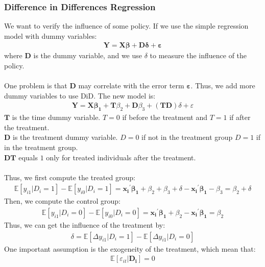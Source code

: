 \documentclass{article}
\begin{document}
\subsubsection{Difference in Differences Regression}
We want to verify the influence of some policy. If we use the simple regression model with dummy variables:
	\begin{align*}
		\boldsymbol{Y} = \boldsymbol{X} \boldsymbol{\beta} + \boldsymbol{D} \boldsymbol{\delta} + \boldsymbol{\varepsilon}
	\end{align*}
where $\boldsymbol{D}$ is the dummy variable, and we use $\delta$ to measure the influence of the policy.\\\\
One problem is that $\boldsymbol{D}$ may correlate with the error term $\boldsymbol{\varepsilon}$. Thus, we add more dummy variables to use DiD. The new model is:
	\begin{align*}
		\boldsymbol{Y} = \boldsymbol{X}\boldsymbol{\beta_1} + \boldsymbol{T}\beta_2 + \boldsymbol{D}\beta_3 + (\boldsymbol{T} \boldsymbol{D}) \delta + \varepsilon
	\end{align*}
$\boldsymbol{T}$ is the time dummy variable. $T = 0$ if before the treatment and $T = 1$ if after the treatment.\\
$\boldsymbol{D}$ is the treatment dummy variable. $D = 0$ if not in the treatment group $D = 1$ if in the treatment group.\\
$\boldsymbol{D} \boldsymbol{T}$ equals $1$ only for treated individuals after the treatment.\\\\
Thus, we first compute the treated group:
	\begin{align*}
		\mathbb{E} [y_{i1} | D_i = 1] - \mathbb{E} [y_{i0} | D_i = 1] = \boldsymbol{x_i}^\prime \boldsymbol{\beta_1} + \beta_2 + \beta_3 + \delta -  \boldsymbol{x_i}^\prime \boldsymbol{\beta_1} - \beta_3 = \beta_2 + \delta
	\end{align*}
Then, we compute the control group:
	\begin{align*}
		\mathbb{E} [y_{i1} | D_i = 0] - \mathbb{E} [y_{i0} | D_i = 0] = \boldsymbol{x_i}^\prime \boldsymbol{\beta_1} +  \beta_2 - \boldsymbol{x_i}^\prime \boldsymbol{\beta_1} = \beta_2 
	\end{align*}
Thus, we can get the influence of the treatment by:
	\begin{align*}
		\delta = \mathbb{E} [\Delta y_{i1} | D_i = 1] - \mathbb{E} [\Delta y_{i1} | D_i = 0]
	\end{align*}
One important assumption is the exogeneity of the treatment, which mean that:
	\begin{align*}
		\mathbb{E} [\varepsilon_{it} | \boldsymbol{D_i}] = 0
	\end{align*}
\end{document}
